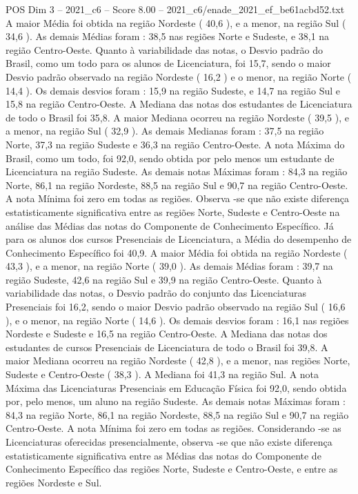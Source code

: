 \begin{textsample}{POS Dim 3 – 2021\_c6 – Score 8.00 – 2021\_c6/enade\_2021\_ef\_be61acbd52.txt}
A maior Média foi obtida na região Nordeste ( 40,6 ), e a menor, na região Sul ( 34,6 ).
As demais Médias foram : 38,5 nas regiões Norte e Sudeste, e 38,1 na região Centro-Oeste.
Quanto à variabilidade das notas, o Desvio padrão do Brasil, como um todo para os alunos de Licenciatura, foi 15,7, sendo o maior Desvio padrão observado na região Nordeste ( 16,2 ) e o menor, na região Norte ( 14,4 ).
Os demais desvios foram : 15,9 na região Sudeste, e 14,7 na região Sul e 15,8 na região Centro-Oeste.
A Mediana das notas dos estudantes de Licenciatura de todo o Brasil foi 35,8.
A maior Mediana ocorreu na região Nordeste ( 39,5 ), e a menor, na região Sul ( 32,9 ).
As demais Medianas foram : 37,5 na região Norte, 37,3 na região Sudeste e 36,3 na região Centro-Oeste.
A nota Máxima do Brasil, como um todo, foi 92,0, sendo obtida por pelo menos um estudante de Licenciatura na região Sudeste.
As demais notas Máximas foram : 84,3 na região Norte, 86,1 na região Nordeste, 88,5 na região Sul e 90,7 na região Centro-Oeste.
A nota Mínima foi zero em todas as regiões.
Observa -se que não existe diferença estatisticamente significativa entre as regiões Norte, Sudeste e Centro-Oeste na análise das Médias das notas do Componente de Conhecimento Específico.
Já para os alunos dos cursos Presenciais de Licenciatura, a Média do desempenho de Conhecimento Específico foi 40,9.
A maior Média foi obtida na região Nordeste ( 43,3 ), e a menor, na região Norte ( 39,0 ).
As demais Médias foram : 39,7 na região Sudeste, 42,6 na região Sul e 39,9 na região Centro-Oeste.
Quanto à variabilidade das notas, o Desvio padrão do conjunto das Licenciaturas Presenciais foi 16,2, sendo o maior Desvio padrão observado na região Sul ( 16,6 ), e o menor, na região Norte ( 14,6 ).
Os demais desvios foram : 16,1 nas regiões Nordeste e Sudeste e 16,5 na região Centro-Oeste.
A Mediana das notas dos estudantes de cursos Presenciais de Licenciatura de todo o Brasil foi 39,8.
A maior Mediana ocorreu na região Nordeste ( 42,8 ), e a menor, nas regiões Norte, Sudeste e Centro-Oeste ( 38,3 ).
A Mediana foi 41,3 na região Sul.
A nota Máxima das Licenciaturas Presenciais em Educação Física foi 92,0, sendo obtida por, pelo menos, um aluno na região Sudeste.
As demais notas Máximas foram : 84,3 na região Norte, 86,1 na região Nordeste, 88,5 na região Sul e 90,7 na região Centro-Oeste.
A nota Mínima foi zero em todas as regiões.
Considerando -se as Licenciaturas oferecidas presencialmente, observa -se que não existe diferença estatisticamente significativa entre as Médias das notas do Componente de Conhecimento Específico das regiões Norte, Sudeste e Centro-Oeste, e entre as regiões Nordeste e Sul.

\end{textsample}
